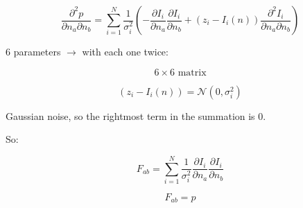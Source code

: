 \documentclass[12pt]{article}
\begin{document}
\[
\frac{\partial^2 p}{\partial n_a \partial n_b}
=
\sum_{i=1}^{N}
\frac{1}{\sigma_i^2}
\left(
-\frac{\partial I_i}{\partial n_a}
\frac{\partial I_i}{\partial n_b}
+
(z_i-I_i(n))
\frac{\partial^2 I_i}{\partial n_a \partial n_b}
\right)
\]

6 parameters \(\rightarrow\) with each one twice:

\[
6\times 6 \text{ matrix}
\]

\[
(z_i-I_i(n))=\mathcal{N}(0,\sigma_i^2)
\]

Gaussian noise, so the rightmost term in the summation is 0.

So:

\[
F_{ab}
=
\sum_{i=1}^{N}
\frac{1}{\sigma_i^2}
\frac{\partial I_i}{\partial n_a}
\frac{\partial I_i}{\partial n_b}
\]

\[
F_{ab}=p
\]
\end{document}
